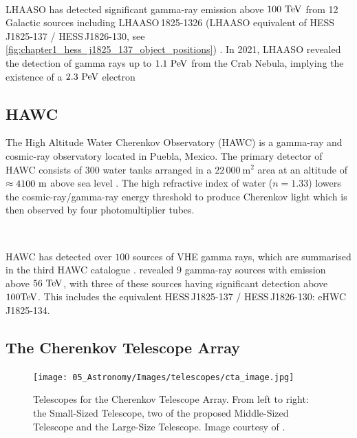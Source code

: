 \par~\par
LHAASO has detected significant gamma-ray emission above $100~\TeV$ from 12 Galactic sources including \mbox{LHAASO\,1825-1326} (LHAASO equivalent of \mbox{HESS\,J1825-137} / \mbox{HESS\,J1826-130}, see \autoref{fig:chapter1_hess_j1825_137_object_positions}) \citep{2021Natur.594...33C}. In 2021, LHAASO revealed the detection of gamma rays up to $1.1~\PeV$ from the Crab Nebula, implying the existence of a $2.3~\PeV$ electron \citep{doi:10.1126/science.abg5137}

\subsection{HAWC}

The High Altitude Water Cherenkov Observatory (HAWC) is a gamma-ray and cosmic-ray observatory located in Puebla, Mexico. The primary detector of HAWC consists of $300$ water tanks arranged in a $22\,000~\si{\meter\squared}$ area at an altitude of $\approx 4100~\si{\meter}$ above sea level \citep{2023NIMPA105268253A}. The high refractive index of water ($n=1.33$) lowers the cosmic-ray/gamma-ray energy threshold to produce Cherenkov light which is then observed by four photomultiplier tubes.
\par~\par
HAWC has detected over $100$ sources of VHE gamma rays, which are summarised in the third HAWC catalogue \citep{2020ApJ...905...76A}. \cite{PhysRevLett.124.021102} revealed $9$ gamma-ray sources with emission above $56~\TeV$, with three of these sources having significant detection above $100\TeV$. This includes the equivalent \mbox{HESS\,J1825-137} / \mbox{HESS\,J1826-130}: \mbox{eHWC\,J1825-134}.

\subsection{The Cherenkov Telescope Array}

\begin{figure}[ht]
    \centering
    \texttt{[image: 05\_Astronomy/Images/telescopes/cta\_image.jpg]}
    \caption{Telescopes for the Cherenkov Telescope Array. From left to right: the Small-Sized Telescope, two of the proposed Middle-Sized Telescope and the Large-Size Telescope. Image courtesy of \cite{cherenkov_telescope_array}.}
    \label{fig:chapter_2_cta}
\end{figure}

